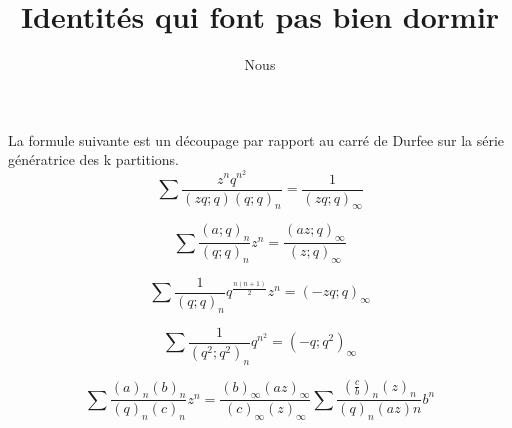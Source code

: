 \documentclass[a4paper,11pt]{article}
\title{Identités qui font pas bien dormir}
\author{Nous}
\begin{document}
\maketitle
La formule suivante est un découpage par rapport au carré de Durfee sur la série
génératrice des k partitions.
$$\sum \frac{z^nq^{n^2}}{(zq;q)(q;q)_n}=\frac{1}{(zq;q)_\infty}$$

$$\sum \frac{(a;q)_n}{(q;q)_n}z^n=\frac{(az;q)_\infty}{(z;q)_\infty}$$

$$\sum \frac{1}{(q;q)_n}q^{\frac{n(n+1)}{2}}z^n=(-zq;q)_\infty$$

$$\sum \frac{1}{(q^2;q^2)_n}q^{n^2}=(-q;q^2)_\infty$$


$$\sum
\frac{(a)_n(b)_n}{(q)_n(c)_n}z^n=
\frac{(b)_\infty(az)_\infty}{(c)_\infty(z)_\infty}
\sum \frac{(\frac{c}{b})_n(z)_n}{(q)_n(az)n}b^n$$




\end{document}
